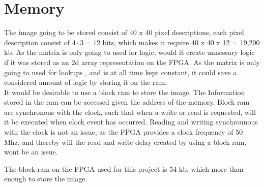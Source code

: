 \section{Memory}
The image going to be stored consist of 40 x 40 pixel descriptions, each pixel description consist of $4 \cdot 3 = 12$ bits,  which makes it require 40 x 40 x 12   =  19,200 kb.  As the matrix is only going to used for logic, would it create unnessary logic if it was stored as an 2d array representation on the FPGA. As the matrix is only going to used for lookups , and is at all time kept constant, it could save a considered amount of logic by storing it on the ram. 	\\
It would be desirable to use a block ram to store the image.  The Information stored in the ram can be accessed given the address of the memory. Block ram are synchronous with the clock, such that when a write or read is requested, will it be executed when clock event has occurred. Reading and writing synchrounous with the clock is not an issue, as the FPGA provides a clock frequency of 50 Mhz, and thereby will the read and write delay created by using a block ram, wont be an issue. 

The block ram on the FPGA used for this project is 54 kb, which more than enough to store the image. 

